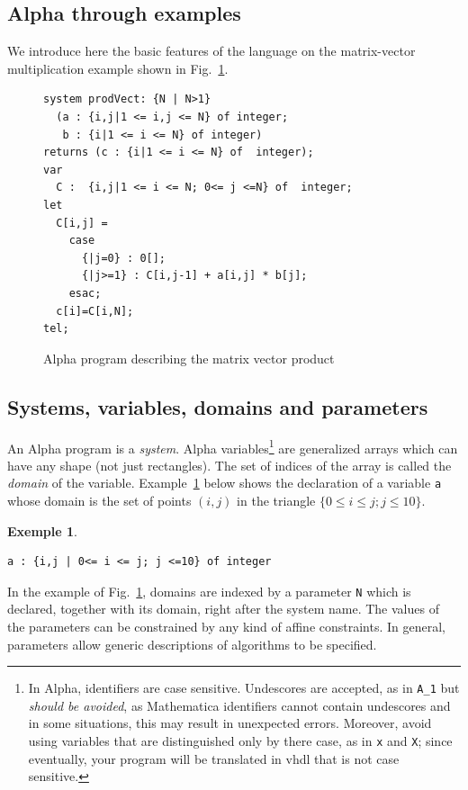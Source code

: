 \documentclass[12pt]{article}
\newcommand{\Alpha}{{\sc Alpha}}
\newcommand{\vhdl}{{\sc vhdl}}
\newcommand{\alfa}{\Alpha}
\newcommand{\mma}{{Mathematica}}
\newtheorem{ex}{Exemple}[section]
\begin{document}
\subsection{{\Alpha} through examples}
\label{alphabyexamples}
We introduce here the basic
features of the language on the matrix-vector multiplication example
shown in Fig.~\ref{fig1}.

\begin{figure}[htbp]
\begin{verbatim}
system prodVect: {N | N>1}
  (a : {i,j|1 <= i,j <= N} of integer; 
   b : {i|1 <= i <= N} of integer)
returns (c : {i|1 <= i <= N} of  integer);
var 
  C :  {i,j|1 <= i <= N; 0<= j <=N} of  integer;
let
  C[i,j] = 
    case
      {|j=0} : 0[];
      {|j>=1} : C[i,j-1] + a[i,j] * b[j];
    esac;
  c[i]=C[i,N];
tel;   
\end{verbatim}
\caption{{\Alpha} program describing the matrix vector product}
\label{fig1}
\end{figure}


\subsection*{Systems, variables, domains and parameters}
An {\Alpha} program is a {\em system}. \alfa{} variables\footnote{In \Alpha{}, 
identifiers are case sensitive. Undescores are accepted, as in 
\texttt{A\_1} but {\em should be avoided}, as \mma{} identifiers
cannot contain undescores and in some situations, this may result in 
unexpected errors. Moreover, avoid using variables that are distinguished
only by there case, as in \texttt{x} and \texttt{X}; since eventually,
your program will be translated in \vhdl{} that is not case sensitive.} are generalized
arrays which can have any shape (not just rectangles).  The set of
indices of the array is called the {\em domain} of the variable.
Example~\ref{ex1} below shows the declaration of a variable {\tt a}
whose domain is the set of points $(i,j)$ in the triangle 
$\{0 \leq i \leq j;j \leq 10\}$.
\begin{ex}{~}
\begin{verbatim}
a : {i,j | 0<= i <= j; j <=10} of integer
\end{verbatim}
\label{ex1}
\end{ex} 
In the example of Fig.~\ref{fig1}, domains are indexed
by a parameter \texttt{N} which is declared, together with its
domain, right after the system name. The values of the parameters
can be constrained by any kind of 
affine constraints. In 
general, parameters allow generic descriptions of algorithms to 
be specified. 
\end{document}
